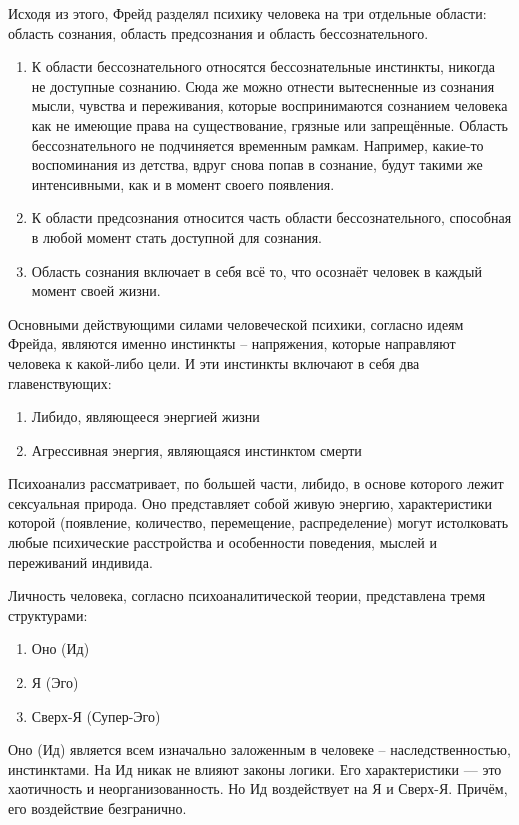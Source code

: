Исходя из этого, Фрейд разделял психику человека на три отдельные области: область сознания, область предсознания и область бессознательного.

\begin{enumerate}
    \item К области бессознательного относятся бессознательные инстинкты, никогда не доступные сознанию. Сюда же можно отнести вытесненные из сознания мысли, чувства и переживания, которые воспринимаются сознанием человека как не имеющие права на существование, грязные или запрещённые. Область бессознательного не подчиняется временным рамкам. Например, какие-то воспоминания из детства, вдруг снова попав в сознание, будут такими же интенсивными, как и в момент своего появления.
    \item К области предсознания относится часть области бессознательного, способная в любой момент стать доступной для сознания.
    \item Область сознания включает в себя всё то, что осознаёт человек в каждый момент своей жизни.
\end{enumerate}

Основными действующими силами человеческой психики, согласно идеям Фрейда, являются именно инстинкты – напряжения, которые направляют человека к какой-либо цели. И эти инстинкты включают в себя два главенствующих:

\begin{enumerate}
    \item Либидо, являющееся энергией жизни
    \item Агрессивная энергия, являющаяся инстинктом смерти
\end{enumerate}

Психоанализ рассматривает, по большей части, либидо, в основе которого лежит сексуальная природа. Оно представляет собой живую энергию, характеристики которой (появление, количество, перемещение, распределение) могут истолковать любые психические расстройства и особенности поведения, мыслей и переживаний индивида.

Личность человека, согласно психоаналитической теории, представлена тремя структурами:
\begin{enumerate}
    \item Оно (Ид)
    \item Я (Эго)
    \item Сверх-Я (Супер-Эго)
\end{enumerate}

Оно (Ид) является всем изначально заложенным в человеке – наследственностью, инстинктами. На Ид никак не влияют законы логики. Его характеристики — это хаотичность и неорганизованность. Но Ид воздействует на Я и Сверх-Я. Причём, его воздействие безгранично.

